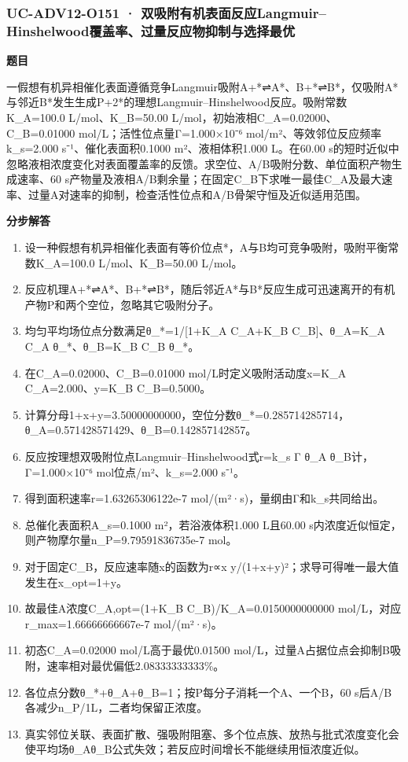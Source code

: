 \documentclass[UTF8,11pt,a4paper]{ctexart}
\begin{document}
\subsubsection*{UC-ADV12-O151 · 双吸附有机表面反应Langmuir–Hinshelwood覆盖率、过量反应物抑制与选择最优}
\noindent\textbf{题目}\par
一假想有机异相催化表面遵循竞争Langmuir吸附A+*⇌A*、B+*⇌B*，仅吸附A*与邻近B*发生生成P+2*的理想Langmuir–Hinshelwood反应。吸附常数K\_A=100.0 L/mol、K\_B=50.00 L/mol，初始液相C\_A=0.02000、C\_B=0.01000 mol/L；活性位点量Γ=1.000×10⁻⁶ mol/m²、等效邻位反应频率k\_s=2.000 s⁻¹、催化表面积0.1000 m²、液相体积1.000 L。在60.00 s的短时近似中忽略液相浓度变化对表面覆盖率的反馈。求空位、A/B吸附分数、单位面积产物生成速率、60 s产物量及液相A/B剩余量；在固定C\_B下求唯一最佳C\_A及最大速率、过量A对速率的抑制，检查活性位点和A/B骨架守恒及近似适用范围。\par
\medskip\noindent\textbf{分步解答}
\begin{enumerate}
\item 设一种假想有机异相催化表面有等价位点*，A与B均可竞争吸附，吸附平衡常数K\_A=100.0 L/mol、K\_B=50.00 L/mol。
\item 反应机理A+*⇌A*、B+*⇌B*，随后邻近A*与B*反应生成可迅速离开的有机产物P和两个空位，忽略其它吸附分子。
\item 均匀平均场位点分数满足θ\_*=1/[1+K\_A C\_A+K\_B C\_B]、θ\_A=K\_A C\_A θ\_*、θ\_B=K\_B C\_B θ\_*。
\item 在C\_A=0.02000、C\_B=0.01000 mol/L时定义吸附活动度x=K\_A C\_A=2.000、y=K\_B C\_B=0.5000。
\item 计算分母1+x+y=3.50000000000，空位分数θ\_*=0.285714285714，θ\_A=0.571428571429、θ\_B=0.142857142857。
\item 反应按理想双吸附位点Langmuir–Hinshelwood式r=k\_s Γ θ\_A θ\_B计，Γ=1.000×10⁻⁶ mol位点/m²、k\_s=2.000 s⁻¹。
\item 得到面积速率r=1.63265306122e-7 mol/(m²·s)，量纲由Γ和k\_s共同给出。
\item 总催化表面积A\_s=0.1000 m²，若浴液体积1.000 L且60.00 s内浓度近似恒定，则产物摩尔量n\_P=9.79591836735e-7 mol。
\item 对于固定C\_B，反应速率随x的函数为r∝x y/(1+x+y)²；求导可得唯一最大值发生在x\_opt=1+y。
\item 故最佳A浓度C\_A,opt=(1+K\_B C\_B)/K\_A=0.0150000000000 mol/L，对应r\_max=1.66666666667e-7 mol/(m²·s)。
\item 初态C\_A=0.02000 mol/L高于最优0.01500 mol/L，过量A占据位点会抑制B吸附，速率相对最优偏低2.08333333333\%。
\item 各位点分数θ\_*+θ\_A+θ\_B=1；按P每分子消耗一个A、一个B，60 s后A/B各减少n\_P/1L，二者均保留正浓度。
\item 真实邻位关联、表面扩散、强吸附阻塞、多个位点族、放热与批式浓度变化会使平均场θ\_Aθ\_B公式失效；若反应时间增长不能继续用恒浓度近似。
\end{enumerate}
\end{document}
